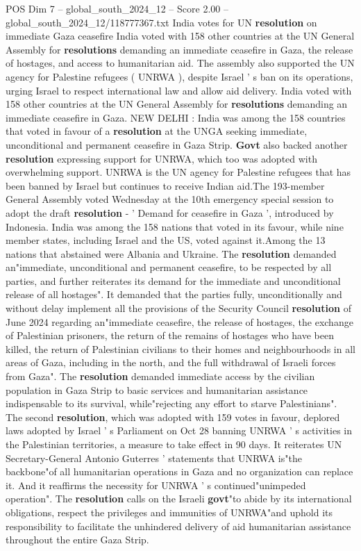 \begin{textsample}{POS Dim 7 – global\_south\_2024\_12 – Score 2.00 – global\_south\_2024\_12/118777367.txt}  \label{ex:f7_pos_156}
India votes for UN \textbf{resolution} on immediate Gaza ceasefire India voted with 158 other countries at the UN General Assembly for \textbf{resolutions} demanding an immediate ceasefire in Gaza, the release of hostages, and access to humanitarian aid.
The assembly also supported the UN agency for Palestine refugees ( UNRWA ), despite Israel ' s ban on its operations, urging Israel to respect international law and allow aid delivery.
India voted with 158 other countries at the UN General Assembly for \textbf{resolutions} demanding an immediate ceasefire in Gaza.
NEW DELHI : India was among the 158 countries that voted in favour of a \textbf{resolution} at the UNGA seeking immediate, unconditional and permanent ceasefire in Gaza Strip. \textbf{Govt} also backed another \textbf{resolution} expressing support for UNRWA, which too was adopted with overwhelming support.
UNRWA is the UN agency for Palestine refugees that has been banned by Israel but continues to receive Indian aid.The 193-member General Assembly voted Wednesday at the 10th emergency special session to adopt the draft \textbf{resolution} - ' Demand for ceasefire in Gaza ', introduced by Indonesia.
India was among the 158 nations that voted in its favour, while nine member states, including Israel and the US, voted against it.Among the 13 nations that abstained were Albania and Ukraine.
The \textbf{resolution} demanded an"immediate, unconditional and permanent ceasefire, to be respected by all parties, and further reiterates its demand for the immediate and unconditional release of all hostages".
It demanded that the parties fully, unconditionally and without delay implement all the provisions of the Security Council \textbf{resolution} of June 2024 regarding an"immediate ceasefire, the release of hostages, the exchange of Palestinian prisoners, the return of the remains of hostages who have been killed, the return of Palestinian civilians to their homes and neighbourhoods in all areas of Gaza, including in the north, and the full withdrawal of Israeli forces from Gaza".
The \textbf{resolution} demanded immediate access by the civilian population in Gaza Strip to basic services and humanitarian assistance indispensable to its survival, while"rejecting any effort to starve Palestinians".
The second \textbf{resolution}, which was adopted with 159 votes in favour, deplored laws adopted by Israel ' s Parliament on Oct 28 banning UNRWA ' s activities in the Palestinian territories, a measure to take effect in 90 days.
It reiterates UN Secretary-General Antonio Guterres ' statements that UNRWA is"the backbone"of all humanitarian operations in Gaza and no organization can replace it.
And it reaffirms the necessity for UNRWA ' s continued"unimpeded operation".
The \textbf{resolution} calls on the Israeli \textbf{govt}"to abide by its international obligations, respect the privileges and immunities of UNRWA"and uphold its responsibility to facilitate the unhindered delivery of aid humanitarian assistance throughout the entire Gaza Strip.

\end{textsample}
